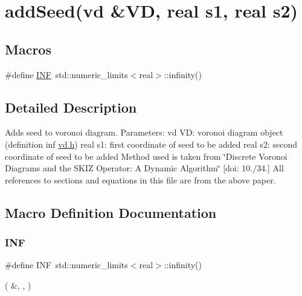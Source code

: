 \hypertarget{group__bool}{}\section{add\+Seed(vd \&VD, real s1, real s2)}
\label{group__bool}
\subsection*{Macros}
\begin{DoxyCompactItemize}
\item 
\#define \mbox{\hyperlink{group__bool_ga12c2040f25d8e3a7b9e1c2024c618cb6}{I\+NF}}~std\+::numeric\+\_\+limits$<$real$>$\+::infinity()
\end{DoxyCompactItemize}


\subsection{Detailed Description}
Adds seed to voronoi diagram. Parameters\+: vd VD\+: voronoi diagram object (definition inf \mbox{\hyperlink{vd_8h_source}{vd.\+h}}) real s1\+: first coordinate of seed to be added real s2\+: second coordinate of seed to be added Method used is taken from \char`\"{}\+Discrete Voronoi Diagrams and the S\+K\+I\+Z
 Operator\+: A Dynamic Algorithm\char`\"{} \mbox{[}doi\+: 10./34.\mbox{]} All references to sections and equations in this file are from the above paper. 

\subsection{Macro Definition Documentation}
\mbox{\label{group__bool_ga12c2040f25d8e3a7b9e1c2024c618cb6}} 
\subsubsection{\texorpdfstring{I\+NF}{INF}}
{\footnotesize\ttfamily \#define I\+NF~std\+::numeric\+\_\+limits$<$real$>$\+::infinity()}

( \&, , ) 